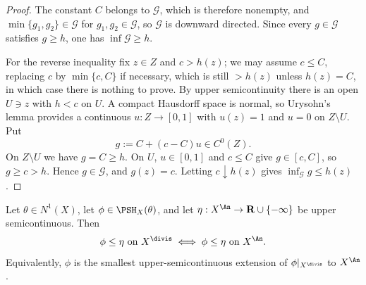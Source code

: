 \begin{proof}
The constant $C$ belongs to $\mathcal G$, which is therefore nonempty,
and $\min\{g_1,g_2\}\in\mathcal G$ for $g_1,g_2\in\mathcal G$, so
$\mathcal G$ is downward directed.  Since every $g\in\mathcal G$ satisfies
$g\geq h$, one has $\inf\mathcal G\geq h$.

For the reverse inequality fix $z\in Z$ and $c>h(z)$; we may assume
$c\leq C$, replacing $c$ by $\min\{c,C\}$ if necessary, which is still
$>h(z)$ unless $h(z)=C$, in which case there is nothing to prove.  By
upper semicontinuity there is an open $U\ni z$ with $h<c$ on $U$.  A
compact Hausdorff space is normal, so Urysohn's lemma provides a continuous
$u:Z\to[0,1]$ with $u(z)=1$ and $u=0$ on $Z\setminus U$.  Put
\[
 g:=C+(c-C)u\in C^0(Z).
\]
On $Z\setminus U$ we have $g=C\geq h$.  On $U$, $u\in[0,1]$ and
$c\leq C$ give $g\in[c,C]$, so $g\geq c>h$.  Hence
$g\in\mathcal G$, and $g(z)=c$.  Letting $c\downarrow h(z)$ gives
$\inf_{\mathcal G}g\leq h(z)$.
\end{proof}

\begin{theorem}
\label{thm:ch35-divisorial-comparison}
Let $\theta\in N^1(X)$, let $\phi\in\PSH_X(\theta)$, and let
$\eta:X^{\An}\to\mathbf R\cup\{-\infty\}$ be upper semicontinuous.  Then
\begin{equation}
\label{eq:ch35-divisorial-comparison}
 \phi\leq\eta\ \text{on }X^{\divis}
 \iff
 \phi\leq\eta\ \text{on }X^{\An}.
\end{equation}
Equivalently, $\phi$ is the smallest upper-semicontinuous extension of
$\phi|_{X^{\divis}}$ to $X^{\An}$.
\end{theorem}

